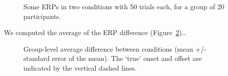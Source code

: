 \documentclass[
  doc,
  floatsintext,
  longtable,
  a4paper,
  nolmodern,
  notxfonts,
  notimes,
  colorlinks=true,linkcolor=blue,citecolor=blue,urlcolor=blue]{apa7}
\begin{document}
\begin{figure}[!htb]

\caption{\label{fig-eeg}Some ERPs in two conditions with 50 trials each,
for a group of 20 participants.}


\end{figure}%

We computed the average of the ERP difference
(Figure~\ref{fig-erp})\ldots{}

\begin{figure}[!htb]

\caption{\label{fig-erp}Group-level average difference between
conditions (mean +/- standard error of the mean). The `true' onset and
offset are indicated by the vertical dashed lines.}


\end{figure}%
\end{document}
